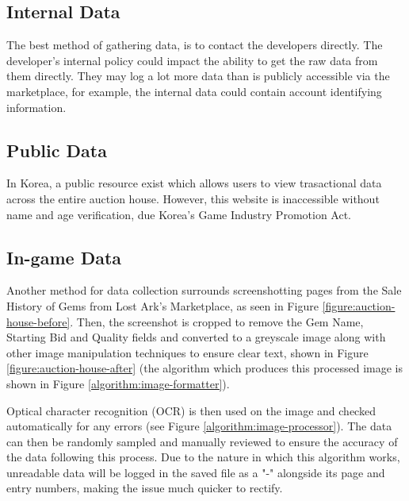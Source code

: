 \documentclass[journal]{IEEEtran}
\begin{document}
\subsection{Internal Data}
\noindent The best method of gathering data, is to contact the developers directly. The developer's internal policy could impact the ability to get the raw data from them directly. They may log a lot more data than is publicly accessible via the marketplace, for example, the internal data could contain account identifying information.

\subsection{Public Data}
\noindent In Korea, a public resource exist which allows users to view trasactional data across the entire auction house\cite{LostArkStove2019}. However, this website is inaccessible without name and age verification, due Korea's Game Industry Promotion Act\cite{GIPA2020kr}.

\subsection{In-game Data}
\noindent Another method for data collection surrounds screenshotting pages from the Sale History of Gems from Lost Ark's Marketplace, as seen in Figure \ref{figure:auction-house-before}. Then, the screenshot is cropped to remove the Gem Name, Starting Bid and Quality fields and converted to a greyscale image along with other image manipulation techniques to ensure clear text, shown in Figure \ref{figure:auction-house-after} (the algorithm which produces this processed image is shown in Figure \ref{algorithm:image-formatter}).

Optical character recognition (OCR) is then used on the image and checked automatically for any errors (see Figure \ref{algorithm:image-processor}). The data can then be randomly sampled and manually reviewed to ensure the accuracy of the data following this process. Due to the nature in which this algorithm works, unreadable data will be logged in the saved file as a "-" alongside its page and entry numbers, making the issue much quicker to rectify.
\end{document}
